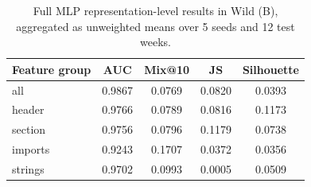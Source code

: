 \begin{table}[t]
\centering
\caption{Full MLP representation-level results in Wild (B), aggregated as unweighted means over 5 seeds and 12 test weeks.}
\label{tab:app_mlp_representation_full}
\small
\begin{tabular}{lcccc}
\toprule
\textbf{Feature group} & \textbf{AUC} & \textbf{Mix@10} & \textbf{JS} & \textbf{Silhouette} \\
\midrule
all     & 0.9867 & 0.0769 & 0.0820 & 0.0393 \\
header  & 0.9766 & 0.0789 & 0.0816 & 0.1173 \\
section & 0.9756 & 0.0796 & 0.1179 & 0.0738 \\
imports & 0.9243 & 0.1707 & 0.0372 & 0.0356 \\
strings & 0.9702 & 0.0993 & 0.0005 & 0.0509 \\
\bottomrule
\end{tabular}
\end{table}